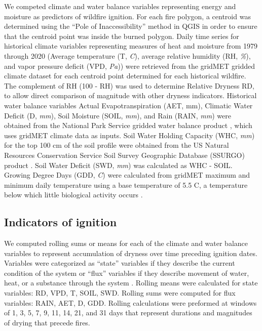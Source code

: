 \documentclass[11p]{article}
\begin{document}

We competed climate and water balance variables representing energy and moisture as predictors of wildfire ignition. For each fire polygon, a centroid was determined using the ``Pole of Inaccessibility'' method in QGIS \citep{QGIS_software} in order to ensure that the centroid point was inside the burned polygon. Daily time series for historical climate variables representing measures of heat and moisture from 1979 through 2020 (Average temperature (T, \textit{\degree C}), average relative humidity (RH, \textit{\%}), and vapor pressure deficit (VPD, \textit{Pa})) were retrieved from the gridMET gridded climate dataset \citep{abatzoglouDevelopmentGriddedSurface2013} for each centroid point determined for each historical wildfire.  The complement of RH (100 - RH) was used to determine Relative Dryness RD, to allow direct comparison of magnitude with other dryness indicators. Historical water balance variables Actual Evapotranspiration (AET, mm), Climatic Water Deficit (D, \textit{mm}), Soil Moisture (SOIL, \textit{mm}), and Rain (RAIN, \textit{mm}) were obtained from the National Park Service gridded water balance product \citep{tercekHistoricalChangesPlant2021}, which uses gridMET climate data as inputs. Soil Water Holding Capacity (WHC, \textit{mm}) for the top 100 cm of the soil profile were obtained from the US Natural Resources Conservation Service 
Soil Survey Geographic Database (SSURGO) product \citep{naturalresourcesconservationserviceSoilSurveyGeographic2015}. Soil Water Deficit (SWD, \textit{mm}) was calculated as WHC - SOIL.  Growing Degree Days (GDD, \textit{\degree C}) were calculated from gridMET maximum and minimum daily temperature using a base temperature of 5.5 \degree C, a temperature below which little biological activity occurs \citep{mcmasterGrowingDegreedaysOne1997}. 

\subsection{Indicators of ignition}

We computed rolling sums or means for each of the climate and water balance variables to represent accumulation of dryness over time preceding ignition dates. Variables were categorized as ``state'' variables if they describe the current condition of the system or ``flux'' variables if they describe movement of water, heat, or a substance through the system \citep{wangInterplaysStateFlux2019,dingmanPhysicalHydrology2015}. Rolling means were calculated for state variables: RD, VPD, T, SOIL, SWD. Rolling sums were computed for flux variables: RAIN, AET, D, GDD. Rolling calculations were preformed at windows of 1, 3, 5, 7, 9, 11, 14, 21, and 31 days that represent durations and magnitudes of drying that precede fires.
\end{document}
